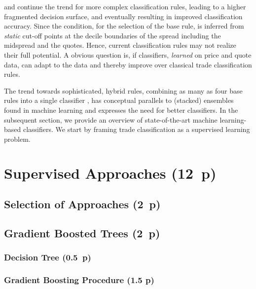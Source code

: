 \textcite[][3811]{chakrabartyTradeClassificationAlgorithms2007} and \textcite[][18]{grauerOptionTradeClassification2022} continue the trend for more complex classification rules, leading to a higher fragmented decision surface, and eventually resulting in improved classification accuracy. Since the condition, for the selection of the base rule, is inferred from \emph{static} cut-off points at the decile boundaries of the spread including the midspread and the quotes. Hence, current classification rules may not realize their full potential. A obvious question is, if classifiers, \emph{learned} on price and quote data, can adapt to the data and thereby improve over classical trade classification rules.

The trend towards sophisticated, hybrid rules, combining as many as four base rules into a single classifier \autocite[cp.][18]{grauerOptionTradeClassification2022}, has conceptual parallels to (stacked) ensembles found in machine learning and expresses the need for better classifiers. In the subsequent section, we provide an overview of state-of-the-art machine learning-based classifiers. We start by framing trade classification as a supervised learning problem.

\newpage
\section{Supervised Approaches (12~p)}\label{sec:supervised-approaches}

\subsection{Selection of Approaches (2~p)}\label{sec:selection-of-approaches}

\subsection{Gradient Boosted Trees (2~p)}\label{sec:gradient-boosted-trees}

\subsubsection{Decision Tree (0.5~p)}\label{sec:decision-tree}

\subsubsection{Gradient Boosting
  Procedure (1.5 p)}\label{sec:gradient-boosting-procedure}

